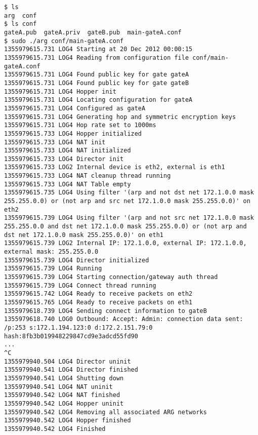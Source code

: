 \begin{lstlisting}[caption=ARG Execution Example]
$ ls
arg  conf
$ ls conf
gateA.pub  gateA.priv  gateB.pub  main-gateA.conf
$ sudo ./arg conf/main-gateA.conf
1355979615.731 LOG4 Starting at 20 Dec 2012 00:00:15
1355979615.731 LOG4 Reading from configuration file conf/main-gateA.conf
1355979615.731 LOG4 Found public key for gate gateA
1355979615.731 LOG4 Found public key for gate gateB
1355979615.731 LOG4 Hopper init
1355979615.731 LOG4 Locating configuration for gateA
1355979615.731 LOG4 Configured as gateA
1355979615.731 LOG4 Generating hop and symmetric encryption keys
1355979615.731 LOG4 Hop rate set to 1000ms
1355979615.733 LOG4 Hopper initialized
1355979615.733 LOG4 NAT init
1355979615.733 LOG4 NAT initialized
1355979615.733 LOG4 Director init
1355979615.733 LOG2 Internal device is eth2, external is eth1
1355979615.733 LOG4 NAT cleanup thread running
1355979615.733 LOG4 NAT Table empty
1355979615.735 LOG4 Using filter '(arp and not dst net 172.1.0.0 mask 255.255.0.0) or (not arp and src net 172.1.0.0 mask 255.255.0.0)' on eth2
1355979615.739 LOG4 Using filter '(arp and not src net 172.1.0.0 mask 255.255.0.0 and dst net 172.1.0.0 mask 255.255.0.0) or (not arp and dst net 172.1.0.0 mask 255.255.0.0)' on eth1
1355979615.739 LOG2 Internal IP: 172.1.0.0, external IP: 172.1.0.0, external mask: 255.255.0.0
1355979615.739 LOG4 Director initialized
1355979615.739 LOG4 Running
1355979615.739 LOG4 Starting connection/gateway auth thread
1355979615.739 LOG4 Connect thread running
1355979615.742 LOG4 Ready to receive packets on eth2
1355979615.765 LOG4 Ready to receive packets on eth1
1355979618.739 LOG4 Sending connect information to gateB
1355979618.740 LOG0 Outbound: Accept: Admin: connection data sent: /p:253 s:172.1.194.123:0 d:172.2.151.79:0 hash:8fb3b019948229847cd9e3adcd55fd90
...
^C
1355979940.504 LOG4 Director uninit
1355979940.541 LOG4 Director finished
1355979940.541 LOG4 Shutting down
1355979940.541 LOG4 NAT uninit
1355979940.542 LOG4 NAT finished
1355979940.542 LOG4 Hopper uninit
1355979940.542 LOG4 Removing all associated ARG networks
1355979940.542 LOG4 Hopper finished
1355979940.542 LOG4 Finished
\end{lstlisting}

